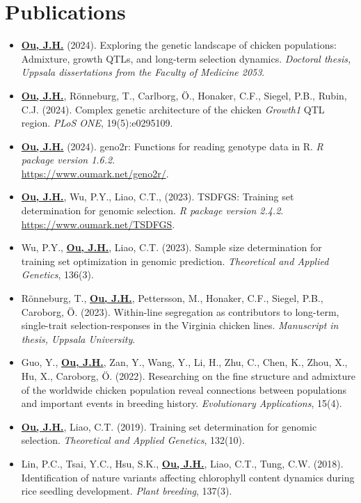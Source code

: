 \documentclass[10pt]{article}
\begin{document}
\section*{Publications}
\begin{itemize}
\item \underline{\bf Ou, J.H.} (2024). Exploring the genetic landscape of chicken populations: Admixture, growth QTLs, and long-term selection dynamics. {\it Doctoral thesis, Uppsala dissertations from the Faculty of Medicine 2053}.
\item \underline{\bf Ou, J.H.}, Rönneburg, T., Carlborg, Ö., Honaker, C.F., Siegel, P.B., Rubin, C.J. (2024). Complex genetic architecture of the chicken {\it Growth1} QTL region. {\it PLoS ONE}, 19(5):e0295109.
\item \underline{\bf Ou, J.H.} (2024). geno2r: Functions for reading genotype data in R. {\it R package version 1.6.2}.\\ \href{https://www.oumark.net/geno2r/}{https://www.oumark.net/geno2r/}.
\item \underline{\bf Ou, J.H.}, Wu, P.Y., Liao, C.T., (2023). TSDFGS: Training set determination for genomic selection. {\it R package version 2.4.2}. \href{https://www.oumark.net/TSDFGS}{https://www.oumark.net/TSDFGS}.
\item Wu, P.Y., \underline{\bf Ou, J.H.}, Liao, C.T. (2023). Sample size determination for training set optimization in genomic prediction. {\it Theoretical and Applied Genetics}, 136(3).
\item Rönneburg, T., \underline{\bf Ou, J.H.}, Pettersson, M., Honaker, C.F., Siegel, P.B., Caroborg, Ö. (2023). Within-line segregation as contributors to long-term, single-trait selection-responses in the Virginia chicken lines. {\it Manuscript in thesis, Uppsala University}.
\item Guo, Y., \underline{\bf Ou, J.H.}, Zan, Y., Wang, Y., Li, H., Zhu, C., Chen, K., Zhou, X., Hu, X., Caroborg, Ö. (2022). Researching on the fine structure and admixture of the worldwide chicken population reveal connections between populations and important events in breeding history. {\it Evolutionary Applications}, 15(4).
\item \underline{\bf Ou, J.H.}, Liao, C.T. (2019). Training set determination for genomic selection. {\it Theoretical and Applied Genetics}, 132(10).
\item Lin, P.C., Tsai, Y.C., Hsu, S.K., \underline{\bf Ou, J.H.}, Liao, C.T., Tung, C.W. (2018). Identification of nature variants affecting chlorophyll content dynamics during rice seedling development. {\it Plant breeding}, 137(3).

\end{itemize}
\end{document}
